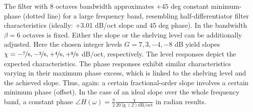 %
The filter with 8 octaves bandwidth approximates $+45$ deg constant
minimum-phase (dotted line) for a large frequency band, resembling half-differentiator
filter characteristics (ideally: +3.01 dB/oct slope and 45 deg phase).
%
%
%
\NewL In  the bandwidth $\beta = 6$
octaves is fixed.
%
Either the slope or the shelving level can be additionally adjusted.
%
Here the chosen integer levels $G = 7,3, -4,-8$ dB yield slopes
$\chi = -\nicefrac{7}{6}, -\nicefrac{3}{6}, +\nicefrac{4}{6}, +\nicefrac{8}{6}$
dB/oct, respectively.
%
The level responses depict the expected characteristics.
%
The phase responses exhibit similar characteristics varying in their
maximum phase excess, which is linked to the shelving level and the achieved
slope.
%
Thus, again: a certain fractional-order slope involves a certain minimum phase
(offset).
%
In the case of an ideal slope over the whole frequency band,
a constant phase
$\angle H(\omega) = \frac{\pi}{2} \frac{\chi}{20\lg(2) \mathrm{dB}/\mathrm{oct}}$
in radian results.
%


